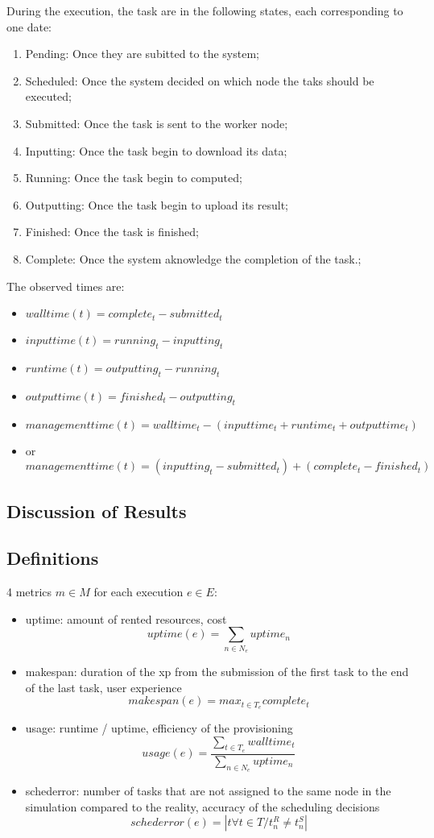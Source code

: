 {During the execution, the task are in the following states, each corresponding to one date:
\begin{enumerate}
 \item Pending: Once they are subitted to the system;
 \item Scheduled: Once the system decided on which node the taks should be executed;
 \item Submitted: Once the task is sent to the worker node;
 \item Inputting: Once the task begin to download its data;
 \item Running: Once the task begin to computed;
 \item Outputting: Once the task begin to upload its result;
 \item Finished: Once the task is finished;
 \item Complete: Once the system aknowledge the completion of the task.;
\end{enumerate}

The observed times are:
\begin{itemize}
 \item $walltime(t) = complete_t - submitted_t$ 
 \item $inputtime(t) = running_t - inputting_t$
 \item $runtime(t) = outputting_t - running_t$
 \item $outputtime(t) = finished_t - outputting_t$
 \item $managementtime(t) = walltime_t - (inputtime_t+runtime_t+outputtime_t)$
 \item or $managementtime(t) = (inputting_t - submitted_t) + (complete_t - finished_t)$
\end{itemize}



\subsection{Discussion of Results}

\subsection{Definitions}
4 metrics $m \in M$ for each execution $e \in E$:
\begin{itemize}
 \item uptime: amount of rented resources, cost 
  $$uptime(e) = \sum_{n \in N_e} uptime_n$$
 \item makespan: duration of the xp from the submission of the first task to 
the end of the last task, user experience 
  $$makespan(e) = max_{t \in T_e} complete_t$$
 \item usage: runtime / uptime, efficiency of the provisioning 
  $$usage(e) = \frac{\sum_{t \in T_e} walltime_t}{\sum_{n \in N_e} uptime_n}$$
 \item schederror: number of tasks that are not assigned to the same node in 
the simulation compared to the reality, accuracy of the scheduling decisions
  $$schederror(e) = |t \forall t \in T / t_n^R \neq t_n^S|$$


\end{itemize}}
